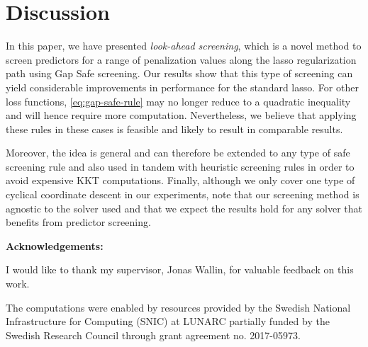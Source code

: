 \documentclass[b5paper,10pt,abstractoff,DIV=calc,headings=normal,twoside]{scrartcl}
\newcommand{\acknowledgements}{\par\mbox{}\par\noindent\textbf{Acknowledgements: }}
\theoremstyle{plain}
\theoremstyle{definition}
\theoremstyle{remark}
\begin{document}
\section{Discussion}%
\label{sec:discussion}

In this paper, we have presented \emph{look-ahead screening}, which is a novel
method to screen predictors for a range of penalization values along the lasso
regularization path using Gap Safe screening. Our results show that this type of
screening can yield considerable improvements in performance for the standard
lasso. For other loss functions,
\eqref{eq:gap-safe-rule} may no longer reduce to a quadratic inequality and will
hence require more computation. Nevertheless, we believe
that applying these rules in these cases is feasible and likely to result
in comparable results.

Moreover, the idea is general and can therefore be extended to any type of safe
screening rule and also used in tandem with heuristic screening rules in order
to avoid expensive KKT computations. Finally, although we only cover one type
of cyclical
coordinate descent in our experiments, note that our screening method is
agnostic to the solver used and that we expect the results
hold for any solver that benefits from predictor screening.

\acknowledgements{
  I would like to thank my supervisor, Jonas Wallin, for valuable feedback
  on this work.

  The computations were enabled by resources provided by the Swedish
  National Infrastructure for Computing (SNIC) at LUNARC partially funded
  by the Swedish Research Council through grant agreement no. 2017-05973.
}


\end{document}
